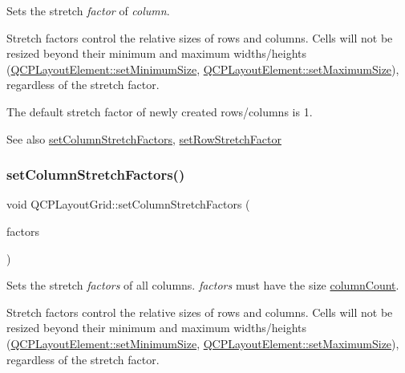 Sets the stretch {\itshape factor} of {\itshape column}.

Stretch factors control the relative sizes of rows and columns. Cells will not be resized beyond their minimum and maximum widths/heights (\hyperlink{class_q_c_p_layout_element_a5dd29a3c8bc88440c97c06b67be7886b}{Q\+C\+P\+Layout\+Element\+::set\+Minimum\+Size}, \hyperlink{class_q_c_p_layout_element_a74eb5280a737ab44833d506db65efd95}{Q\+C\+P\+Layout\+Element\+::set\+Maximum\+Size}), regardless of the stretch factor.

The default stretch factor of newly created rows/columns is 1.

\begin{DoxySeeAlso}{See also}
\hyperlink{class_q_c_p_layout_grid_a6c2591d1a7e2534ce036989543b49e57}{set\+Column\+Stretch\+Factors}, \hyperlink{class_q_c_p_layout_grid_a7b0273de5369bd93d942edbaf5b166ec}{set\+Row\+Stretch\+Factor} 
\end{DoxySeeAlso}
\mbox{\label{class_q_c_p_layout_grid_a6c2591d1a7e2534ce036989543b49e57}} 
\subsubsection{\texorpdfstring{set\+Column\+Stretch\+Factors()}{setColumnStretchFactors()}}
{\footnotesize\ttfamily void Q\+C\+P\+Layout\+Grid\+::set\+Column\+Stretch\+Factors (\begin{DoxyParamCaption}\item[{const Q\+List$<$ double $>$ \&}]{factors }\end{DoxyParamCaption})}

Sets the stretch {\itshape factors} of all columns. {\itshape factors} must have the size \hyperlink{class_q_c_p_layout_grid_a1a2962cbf45011405b64b913afa8e7a2}{column\+Count}.

Stretch factors control the relative sizes of rows and columns. Cells will not be resized beyond their minimum and maximum widths/heights (\hyperlink{class_q_c_p_layout_element_a5dd29a3c8bc88440c97c06b67be7886b}{Q\+C\+P\+Layout\+Element\+::set\+Minimum\+Size}, \hyperlink{class_q_c_p_layout_element_a74eb5280a737ab44833d506db65efd95}{Q\+C\+P\+Layout\+Element\+::set\+Maximum\+Size}), regardless of the stretch factor.

